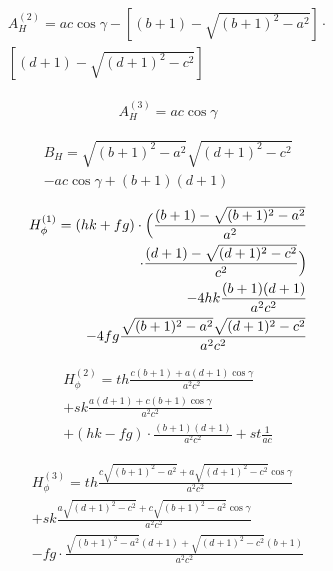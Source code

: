 \begin{equation}\begin{aligned}
A_H^{(2)} = ac\cos\gamma - \left[(b+1)-\sqrt{(b+1)^2 - a^2}\right] \cdot \\ \left[(d+1)-\sqrt{(d+1)^2 - c^2}\right]
\end{aligned}\end{equation}

\begin{equation}\begin{aligned}
A_H^{(3)} = ac\cos\gamma
\end{aligned}\end{equation}

\begin{equation}\begin{aligned}
B_H = \sqrt{(b+1)^2 - a^2}\sqrt{(d+1)^2 - c^2} \\ - ac\cos \gamma + (b+1)(d+1)
\end{aligned}\end{equation}

\begin{equation}\begin{aligned}
H_{\phi}^{(1)} = (hk + fg)\cdot \Bigl(\frac{(b+1)-\sqrt{(b+1)^2 - a^2}}{a^2} \\ \cdot \frac{(d+1)-\sqrt{(d+1)^2 - c^2}}{c^2}\Bigr) \\ - 4 h k \frac{(b+1)(d+1)}{a^2 c^2} \\ - 4 f g \frac{\sqrt{(b+1)^2 - a^2}\sqrt{(d+1)^2 - c^2}}{a^2 c^2}
\end{aligned}\end{equation}

\begin{equation}\begin{aligned}
H_{\phi}^{(2)} = th \frac{c(b+1)+a(d+1) \cos \gamma}{a^2c^2} \\ + sk \frac{a(d+1)+ c(b+1)\cos \gamma}{a^2c^2} \\ + (hk - fg)\cdot\frac{(b+1)(d+1)}{a^2c^2} + st \frac{1}{ac}
\end{aligned}\end{equation}

\begin{equation}\begin{aligned}
H_{\phi}^{(3)} = th \frac{c\sqrt{(b+1)^2 - a^2} + a\sqrt{(d+1)^2 - c^2} \cos \gamma}{a^2c^2} \\ + sk \frac{a\sqrt{(d+1)^2 - c^2} + c\sqrt{(b+1)^2 - a^2}\cos\gamma}{a^2c^2} \\ - fg \cdot\frac{\sqrt{(b+1)^2 - a^2}(d+1) + \sqrt{(d+1)^2 - c^2}(b+1)}{a^2c^2}
\end{aligned}\end{equation}

